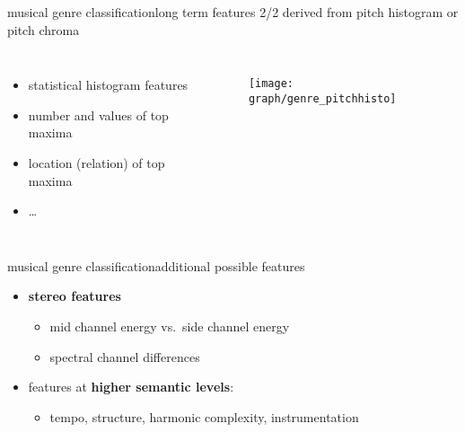         \begin{frame}{musical genre classification}{long term features 2/2}
            derived from pitch histogram or pitch chroma
            \begin{columns}
                \begin{itemize}
                    \item   statistical histogram features
                    \item   number and values of top maxima
                    \item   location (relation) of top maxima
                    \item   \ldots
                \end{itemize}
            \vspace{-3mm}
            \begin{figure}
                \centering
                \texttt{[image: graph/genre\_pitchhisto]}
            \end{figure}
            \end{columns}
        \end{frame}
        \begin{frame}{musical genre classification}{additional possible features}
            \begin{itemize}
                \item	\textbf{stereo features}
                    \begin{itemize}
                        \item	mid channel energy vs.\ side channel energy
                        \item	spectral channel differences
                    \end{itemize}
                \bigskip
                \item<2->	features at \textbf{higher semantic levels}:
                    \begin{itemize}
                        \item   tempo, structure, harmonic complexity, instrumentation
                    \end{itemize}
            \end{itemize}
        \end{frame}


